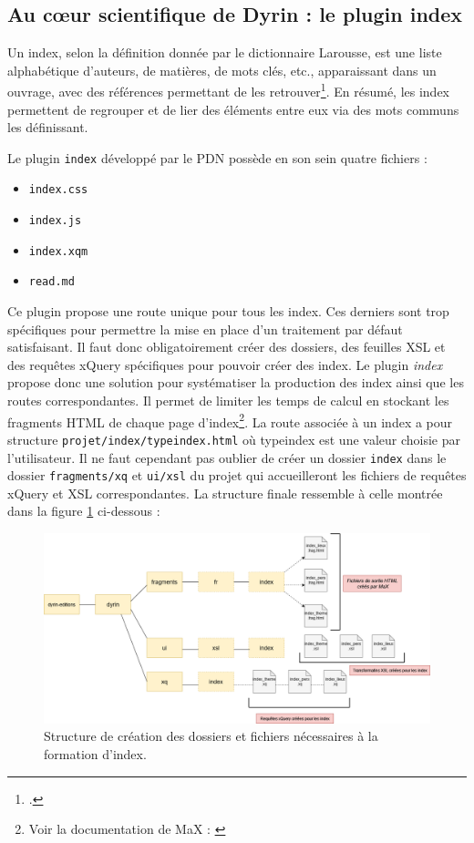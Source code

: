 \documentclass[a4paper,12pt,twoside]{book}
\begin{document}
\subsection{Au c\oe{}ur scientifique de Dyrin : le plugin index}
Un index, selon la définition donnée par le dictionnaire Larousse, est une \og liste alphabétique d'auteurs, de matières, de mots clés, etc., apparaissant dans un ouvrage, avec des références permettant de les retrouver\fg\footcite{larousse}. En résumé, les index permettent de regrouper et de lier des éléments entre eux via des mots communs les définissant.

Le plugin \texttt{index} développé par le \acrshort{PDN} possède en son sein quatre fichiers :
\begin{itemize}
    \item \texttt{index.css}
    \item \texttt{index.js}
    \item \texttt{index.xqm}
    \item \texttt{read.md}
\end{itemize}

Ce plugin propose une route unique pour tous les index. Ces derniers sont trop spécifiques pour permettre la mise en place d'un traitement par défaut satisfaisant. Il faut donc obligatoirement créer des dossiers, des feuilles \acrshort{XSL} et des requêtes xQuery spécifiques pour pouvoir créer des index.
Le plugin \textit{index} propose donc une solution pour systématiser la production des index ainsi que les routes correspondantes.
Il permet de limiter les temps de calcul en stockant les fragments \acrshort{HTML} de chaque page d'index\footnote{Voir la documentation de MaX : \cite{maxdoc}}. La route associée à un index a pour structure \texttt{projet/index/typeindex.html} où \og typeindex \fg est une valeur choisie par l'utilisateur. Il ne faut cependant pas oublier de créer un dossier \texttt{index} dans le dossier \texttt{fragments/xq} et \texttt{ui/xsl} du projet qui accueilleront les fichiers de requêtes xQuery et \acrshort{XSL} correspondantes. La structure finale ressemble à celle montrée dans la figure \ref{index} ci-dessous :

\begin{figure}[H]
    \centering
    \includegraphics[width=13cm]{img/partie_3/index.png}
    \caption{Structure de création des dossiers et fichiers nécessaires à la formation d'index.}
    \label{index}
\end{figure}
\end{document}

